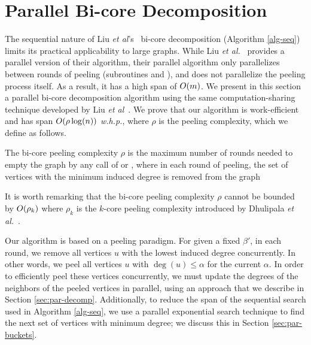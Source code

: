 \section{Parallel Bi-core Decomposition}\label{sec:par}

The sequential nature of Liu \textit{et al}'s~\cite{Liu2020Efficient} bi-core decomposition (Algorithm \ref{alg-seq}) limits its practical applicability to large graphs. While Liu \textit{et al.}~\cite{Liu2020Efficient} provides a parallel version of their algorithm, their parallel algorithm only parallelizes between rounds of peeling (subroutines  and ), and does not parallelize the peeling process itself. As a result, it has a high span of $O(m)$. We present in this section a parallel bi-core decomposition algorithm using the same computation-sharing technique developed by Liu \textit{et al}~\cite{Liu2020Efficient}. We prove that our algorithm is work-efficient and has span $O(\rho \log(n))$ \textit{w.h.p.}, where \emph{$\rho$} is the peeling complexity, which we define as follows.

\begin{definition}\label{def:peeling-complex}
The bi-core peeling complexity $\rho$ is the maximum number of rounds needed to empty the graph by any call of  or , where in each round of peeling, the set of vertices with the minimum induced degree is removed from the graph 
\end{definition}

It is worth remarking that the bi-core peeling complexity $\rho$ cannot be bounded by $O(\rho_k)$ where $\rho_k$ is the $k$-core peeling complexity introduced by Dhulipala \textit{et al.}~\cite{DhBlSh18}.

Our algorithm is based on a peeling paradigm. For  given a fixed $\beta'$, in each round, we remove all vertices $u$ with the lowest induced degree concurrently. In other words, we peel all vertices $u$ with $\deg(u)\le \alpha$ for the current $\alpha$. 
In order to efficiently peel these vertices concurrently, we must update the degrees of the neighbors of the peeled vertices in parallel, using an approach that we describe in Section \ref{sec:par-decomp}.
Additionally, to reduce the span of the sequential search used in Algorithm \ref{alg-seq}, we use a parallel exponential search technique to find the next set of vertices with minimum degree; we discuss this in Section \ref{sec:par-buckets}. 

